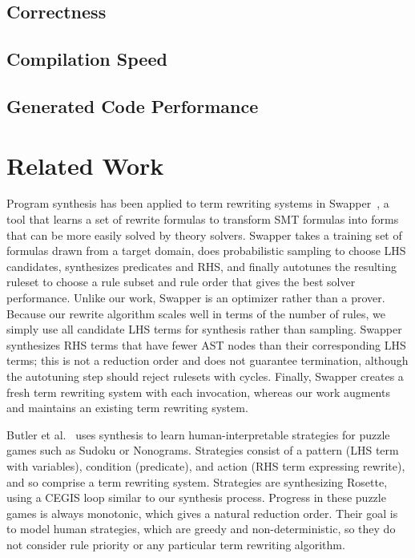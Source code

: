\documentclass[sigplan,review,anonymous]{acmart}\settopmatter{printfolios=true,printccs=false,printacmref=false}
\begin{document}
\subsection{Correctness}

\subsection{Compilation Speed}

\subsection{Generated Code Performance}


\section{Related Work}

Program synthesis has been applied to term rewriting systems in Swapper~\cite{singh2016swapper}, a tool that learns a set of rewrite formulas to transform SMT formulas into forms that can be more easily solved by theory solvers. Swapper takes a training set of formulas drawn from a target domain, does probabilistic sampling to choose LHS candidates, synthesizes predicates and RHS, and finally autotunes the resulting ruleset to choose a rule subset and rule order that gives the best solver performance. Unlike our work, Swapper is an optimizer rather than a prover. Because our rewrite algorithm scales well in terms of the number of rules, we simply use all candidate LHS terms for synthesis rather than sampling. Swapper synthesizes RHS terms that have fewer AST nodes than their corresponding LHS terms; this is not a reduction order and does not guarantee termination, although the autotuning step should reject rulesets with cycles. Finally, Swapper creates a fresh term rewriting system with each invocation, whereas our work augments and maintains an existing term rewriting system.

Butler et al.~\cite{butler2017synthesizing} uses synthesis to learn human-interpretable strategies for puzzle games such as Sudoku or Nonograms. Strategies consist of a pattern (LHS term with variables), condition (predicate), and action (RHS term expressing rewrite), and so comprise a term rewriting system. Strategies are synthesizing Rosette, using a CEGIS loop similar to our synthesis process. Progress in these puzzle games is always monotonic, which gives a natural reduction order. Their goal is to model human strategies, which are greedy and non-deterministic, so they do not consider rule priority or any particular term rewriting algorithm. 
\end{document}

